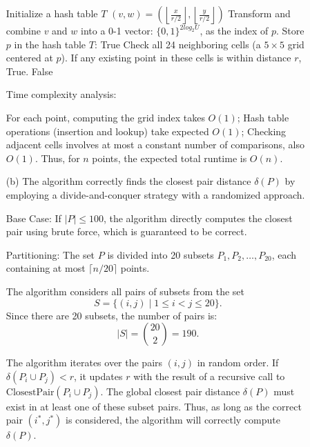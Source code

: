 \documentclass[11pt]{article}
\begin{document}
\begin{description}
\begin{enumerate}
  \begin{algorithm}
  \caption{}
  \begin{algorithmic}[1]
    \State Initialize a hash table $T$
      \State $(v,w) =
        \left(\left\lfloor \frac{x}{r/2} \right\rfloor, 
        \left\lfloor \frac{y}{r/2} \right\rfloor \right)$
      \State Transform and combine $v$ and $w$ into a 0-1 vector: $\{0,1\}^{2log_2U}$, 
      as the index of $p$.
      \State Store $p$ in the hash table $T$:
        \State \Return True
      \Else
        \State Check all 24 neighboring cells (a $5\times5$ grid centered at $p$). 
        If any existing point in these cells is within distance $r$, \Return True.
      \EndIf
    \EndFor
    \State \Return False
  \end{algorithmic}
  \end{algorithm}

  Time complexity analysis:

  For each point, computing the grid index takes $O(1)$; 
  Hash table operations (insertion and lookup) take expected $O(1)$;
  Checking adjacent cells involves at most a constant number of comparisons, also $O(1)$.
  Thus, for $n$ points, the expected total runtime is $O(n)$.

  \item[(b)]
  The algorithm correctly finds the closest pair distance $\delta(P)$ 
  by employing a divide-and-conquer strategy with a randomized approach.

  Base Case: If $|P| \leq 100$, the algorithm directly computes the closest pair using brute force, 
  which is guaranteed to be correct.

  Partitioning: The set $P$ is divided into 20 subsets $P_1, P_2, \dots, P_{20}$, 
  each containing at most $\lceil n/20 \rceil$ points.

  The algorithm considers all pairs of subsets from the set 
    \[
    S = \{(i, j) \mid 1 \leq i < j \leq 20\}.
    \]
  Since there are 20 subsets, the number of pairs is:
    \[
    |S| = \binom{20}{2} = 190.
    \]

  The algorithm iterates over the pairs $(i,j)$ in random order. 
  If $\delta(P_i \cup P_j) < r$, it updates $r$ with the result of a recursive call 
  to $\text{ClosestPair}(P_i \cup P_j)$.
  The global closest pair distance $\delta(P)$ must exist in at least one of these subset pairs. 
  Thus, as long as the correct pair $(i^*, j^*)$ is considered, 
  the algorithm will correctly compute $\delta(P)$.


\end{enumerate}
\end{description}
\end{document}
